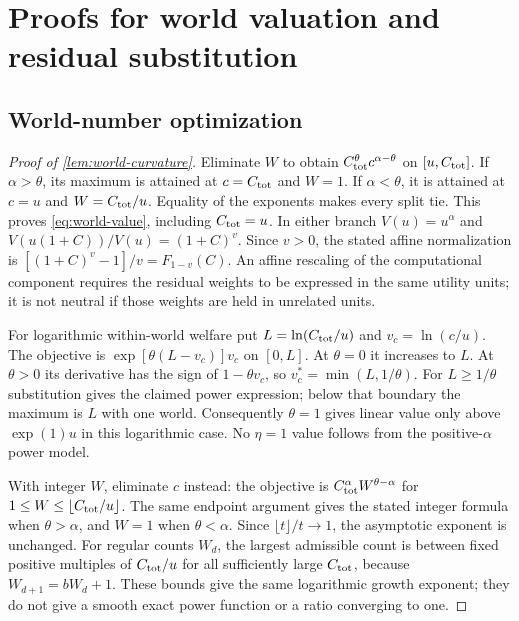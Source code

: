 \section{Proofs for world valuation and residual substitution}
\label{app:stage23}
\subsection{World-number optimization}
\label{app:world-proof}
\begin{proof}[Proof of \cref{lem:world-curvature}]
Eliminate $W$ to obtain $C_{\rm tot}^{\theta}c^{\alpha-\theta}$ on
$[u,C_{\rm tot}]$. If $\alpha>\theta$, its maximum is attained at
$c=C_{\rm tot}$ and $W=1$. If $\alpha<\theta$, it is attained at
$c=u$ and $W=C_{\rm tot}/u$. Equality of the exponents makes every
split tie. This proves \cref{eq:world-value}, including $C_{\rm tot}=u$.
In either branch $V(u)=u^\alpha$ and
$V(u(1+C))/V(u)=(1+C)^v$. Since $v>0$, the stated affine
normalization is $[(1+C)^v-1]/v=F_{1-v}(C)$.
An affine rescaling of the computational component requires the residual
weights to be expressed in the same utility units; it is not neutral if
those weights are held in unrelated units.

For logarithmic within-world welfare put $L=\ln(C_{\rm tot}/u)$ and
$v_c=\ln(c/u)$. The objective is $\exp[\theta(L-v_c)]v_c$ on $[0,L]$.
At $\theta=0$ it increases to $L$. At $\theta>0$ its derivative has the
sign of $1-\theta v_c$, so $v_c^*=\min(L,1/\theta)$. For
$L\geq1/\theta$ substitution gives the claimed power expression;
below that boundary the maximum is $L$ with one world. Consequently
$\theta=1$ gives linear value only above $\exp(1)u$ in this logarithmic
case. No $\eta=1$ value follows from the positive-$\alpha$ power model.

With integer $W$, eliminate $c$ instead: the objective is
$C_{\rm tot}^\alpha W^{\theta-\alpha}$ for
$1\leq W\leq\lfloor C_{\rm tot}/u\rfloor$. The same endpoint argument
gives the stated integer formula when $\theta>\alpha$, and $W=1$
when $\theta<\alpha$. Since $\lfloor t\rfloor/t\to1$, the asymptotic
exponent is unchanged. For regular counts $W_d$, the largest admissible
count is between fixed positive multiples of $C_{\rm tot}/u$ for all
sufficiently large $C_{\rm tot}$, because $W_{d+1}=bW_d+1$.
These bounds give the same logarithmic growth exponent; they do not
give a smooth exact power function or a ratio converging to one.
\end{proof}

